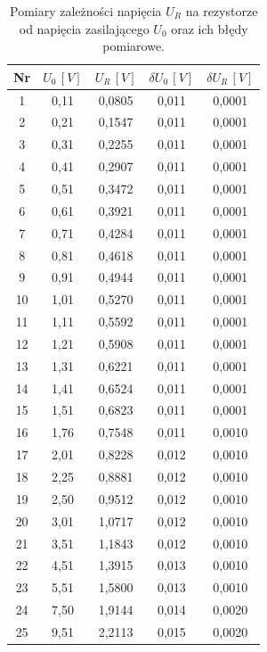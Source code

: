 \documentclass[12pt]{article}
\begin{document}
\begin{table}[H]
    \centering
    \begin{tabular}{c|cccc}
        \toprule
        Nr & $U_0 \,[V]$ & $U_R \,[V]$ & $\delta U_0 \,[V]$ & $\delta U_R \,[V]$ \\
        \midrule
        1  & 0{,}11  & 0{,}0805 & 0{,}011 & 0{,}0001  \\
        2  & 0{,}21  & 0{,}1547 & 0{,}011 & 0{,}0001  \\
        3  & 0{,}31  & 0{,}2255 & 0{,}011 & 0{,}0001  \\
        4  & 0{,}41  & 0{,}2907 & 0{,}011 & 0{,}0001  \\
        5  & 0{,}51  & 0{,}3472 & 0{,}011 & 0{,}0001  \\
        6  & 0{,}61  & 0{,}3921 & 0{,}011 & 0{,}0001  \\
        7  & 0{,}71  & 0{,}4284 & 0{,}011 & 0{,}0001  \\
        8  & 0{,}81  & 0{,}4618 & 0{,}011 & 0{,}0001  \\
        9  & 0{,}91  & 0{,}4944 & 0{,}011 & 0{,}0001  \\
        10 & 1{,}01  & 0{,}5270 & 0{,}011 & 0{,}0001  \\
        11 & 1{,}11  & 0{,}5592 & 0{,}011 & 0{,}0001  \\
        12 & 1{,}21  & 0{,}5908 & 0{,}011 & 0{,}0001  \\
        13 & 1{,}31  & 0{,}6221 & 0{,}011 & 0{,}0001  \\
        14 & 1{,}41  & 0{,}6524 & 0{,}011 & 0{,}0001  \\
        15 & 1{,}51  & 0{,}6823 & 0{,}011 & 0{,}0001  \\
        16 & 1{,}76  & 0{,}7548 & 0{,}011 & 0{,}0010  \\
        17 & 2{,}01  & 0{,}8228 & 0{,}012 & 0{,}0010  \\
        18 & 2{,}25  & 0{,}8881 & 0{,}012 & 0{,}0010  \\
        19 & 2{,}50  & 0{,}9512 & 0{,}012 & 0{,}0010  \\
        20 & 3{,}01  & 1{,}0717 & 0{,}012 & 0{,}0010  \\
        21 & 3{,}51  & 1{,}1843 & 0{,}012 & 0{,}0010  \\
        22 & 4{,}51  & 1{,}3915 & 0{,}013 & 0{,}0010  \\
        23 & 5{,}51  & 1{,}5800 & 0{,}013 & 0{,}0010  \\
        24 & 7{,}50  & 1{,}9144 & 0{,}014 & 0{,}0020  \\
        25 & 9{,}51  & 2{,}2113 & 0{,}015 & 0{,}0020  \\
        \bottomrule
    \end{tabular}
    \caption{Pomiary zależności napięcia $U_R$ na rezystorze od napięcia zasilającego $U_0$ oraz ich błędy pomiarowe.}
    \label{tab:resistor_voltage}
\end{table}
\end{document}
